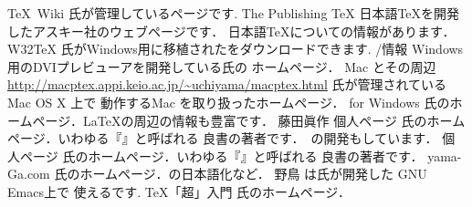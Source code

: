 \begin{urllist}
%
%
     \TeX~Wiki
     \sanko \webTeXWiki
     \sanko {}氏が管理しているページです. 
%
     The Publishing {\TeX}
     \sanko \webASCII
     \sanko 日本語{\TeX}を開発したアスキー社のウェブページです．
           日本語{\TeX}についての情報があります．
%
     W32\TeX
     \sanko \webWinTeX
     \sanko {}氏が{Windows}用に移植された{\pTeX}をダウンロードできます. 
%
     /情報
     \sanko \webOshima
     \sanko Windows用のDVIプレビューア\Dviout を開発している氏の
     ホームページ．
%
     Mac {\pTeX}とその周辺
     \sanko \url{http://macptex.appi.keio.ac.jp/~uchiyama/macptex.html}
     \sanko{}氏が管理されているMac OS X 上で
     動作するMac {\pTeX}を取り扱ったホームページ．
%
     {\pLaTeX} for Windows
     \sanko \webOishi
     \sanko {}氏のホームページ．{\LaTeX}の周辺の情報も豊富です．
%
%     
     藤田眞作 個人ページ
     \sanko \webFujita
     \sanko {}氏のホームページ．いわゆる『』と呼ばれる
     良書の著者です．{\XyMTeX}~\cite{xymtex}の開発もしています．
%
     個人ページ
     \sanko \webOtobe
     \sanko {}氏のホームページ．いわゆる『』と呼ばれる
     良書の著者です．
     yama-Ga.com
     \sanko \webYamaga
     \sanko {}氏のホームページ．の日本語化など．
%
     野鳥
     \sanko \webYaTeX
     \sanko {}は氏が開発した
     {GNU Emacs}上で 使えるです. %
%
%
     {\TeX}「超」入門
     \sanko \webTony
     \sanko {}氏のホームページ．

\end{urllist}
